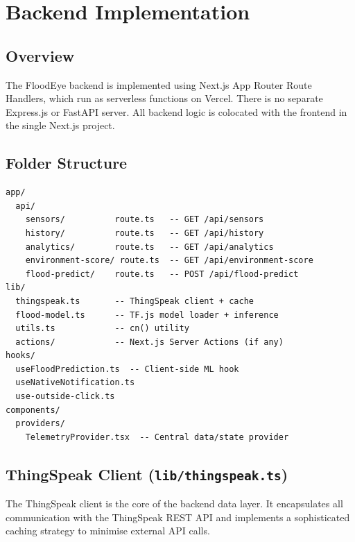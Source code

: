 ﻿%
\chapter{Backend Implementation}

\section{Overview}

The FloodEye backend is implemented using Next.js App Router Route Handlers, which run as serverless functions on Vercel. There is no separate Express.js or FastAPI server. All backend logic is colocated with the frontend in the single Next.js project.

\section{Folder Structure}

\begin{lstlisting}[language={},caption={Backend-relevant directory structure},label={lst:folder_structure}]
app/
  api/
    sensors/          route.ts   -- GET /api/sensors
    history/          route.ts   -- GET /api/history
    analytics/        route.ts   -- GET /api/analytics
    environment-score/ route.ts  -- GET /api/environment-score
    flood-predict/    route.ts   -- POST /api/flood-predict
lib/
  thingspeak.ts       -- ThingSpeak client + cache
  flood-model.ts      -- TF.js model loader + inference
  utils.ts            -- cn() utility
  actions/            -- Next.js Server Actions (if any)
hooks/
  useFloodPrediction.ts  -- Client-side ML hook
  useNativeNotification.ts
  use-outside-click.ts
components/
  providers/
    TelemetryProvider.tsx  -- Central data/state provider
\end{lstlisting}

\section{ThingSpeak Client (\texttt{lib/\allowbreak{}thingspeak.\allowbreak{}ts})}

The ThingSpeak client is the core of the backend data layer. It encapsulates all communication with the ThingSpeak REST API and implements a sophisticated caching strategy to minimise external API calls.

